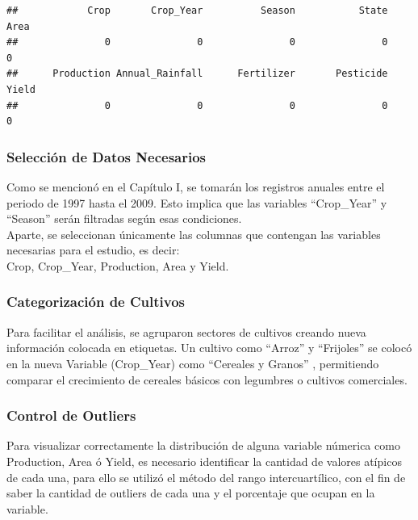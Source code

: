 \documentclass[oneside,11pt]{Latex/Classes/PhDthesisPSnPDF}
\begin{document}
\begin{verbatim}
##            Crop       Crop_Year          Season           State            Area 
##               0               0               0               0               0 
##      Production Annual_Rainfall      Fertilizer       Pesticide           Yield 
##               0               0               0               0               0
\end{verbatim}

\subsubsection{Selección de Datos Necesarios}

Como se mencionó en el Capítulo I, se tomarán los registros anuales
entre el periodo de 1997 hasta el 2009. Esto implica que las variables
``Crop\_Year'' y ``Season'' serán filtradas según esas condiciones.\\

Aparte, se seleccionan únicamente las columnas que contengan las
variables necesarias para el estudio, es decir:\\

Crop, Crop\_Year, Production, Area y Yield.\\

\subsubsection{Categorización de Cultivos}

Para facilitar el análisis, se agruparon sectores de cultivos creando
nueva información colocada en etiquetas. Un cultivo como ``Arroz'' y
``Frijoles'' se colocó en la nueva Variable (Crop\_Year) como ``Cereales
y Granos'' , permitiendo comparar el crecimiento de cereales básicos con
legumbres o cultivos comerciales.\\

\subsubsection{Control de Outliers}

Para visualizar correctamente la distribución de alguna variable
númerica como Production, Area ó Yield, es necesario identificar la
cantidad de valores atípicos de cada una, para ello se utilizó el método
del rango intercuartílico, con el fin de saber la cantidad de outliers
de cada una y el porcentaje que ocupan en la variable.\\
\end{document}
